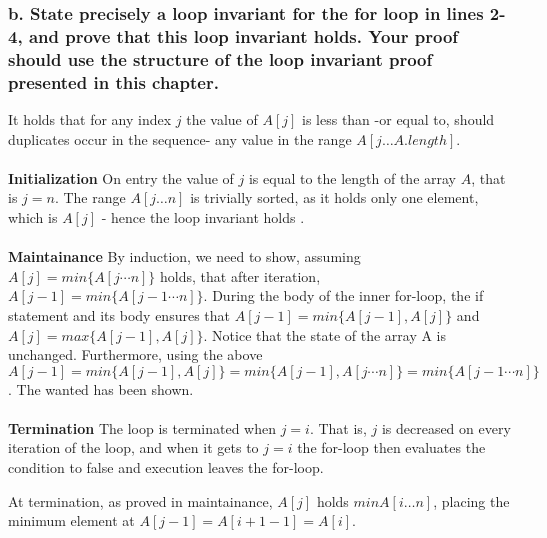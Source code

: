 \documentclass[11pt,english]{article}
\begin{document}
\subsubsection*{b. \mdseries State precisely a loop invariant for the
\textbf{for} loop in lines 2-4, and prove that this loop invariant holds. Your
proof should use the structure of the loop invariant proof presented in this
chapter.}
It holds that for any index $j$ the value of $A[j]$ is less than -or equal to,
should duplicates occur in the sequence- any value in the range
$A[j \dots A.length]$.
\\\\
\textbf{Initialization} \mdseries On entry the value of $j$ is equal to the
length of the array $A$, that is $j = n$. The range $A[j \dots n]$ is
trivially sorted, as it holds only one element, which is $A[j]$ - hence the
loop invariant holds .
\\\\
\textbf{Maintainance} \mdseries By induction, we need to show, assuming $A[j]
= min\{A[j \cdots n]\}$ holds, that after iteration, $A[j-1] = min\{
A[j-1 \cdots n]\}$. During the body of the inner for-loop, the if
statement and its body ensures that $A[j-1] = min\{A[j-1],A[j]\}$ and $A[j] 
= max\{A[j-1],A[j]\}$. Notice that the state of the array A is unchanged.
Furthermore, using the above $A[j-1] = min\{A[j-1],A[j]\} = min\{A[j-1],
A[j \cdots n]\} = min\{A[j-1 \cdots n]\}$. The wanted has been shown.
\\\\
\textbf{Termination} \mdseries The loop is terminated when $j = i$. That is,
$j$ is decreased on every iteration of the loop, and when it gets to
$j = i$ the for-loop then evaluates the condition to false and execution
leaves the for-loop.

At termination, as proved in maintainance, $A[j]$ holds $min{A[i \dots n]}$,
placing the minimum element at $A[j - 1] = A[i + 1 - 1] = A[i]$.
\end{document}
